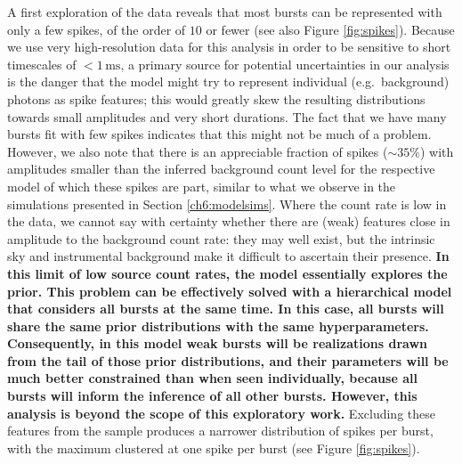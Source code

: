 \documentclass[12pt]{emulateapj}
\newcommand{\project}[1]{\textsl{#1}}
\newcommand{\fermi}{\project{Fermi}}
\begin{document}
A first exploration of the data reveals that most bursts can be represented with only a few spikes, of the order of 
$10$ or fewer (see also Figure \ref{fig:spikes}). Because we use very high-resolution data for this analysis in order to
be sensitive to short timescales of $< 1\,\mathrm{ms}$, a primary source for potential uncertainties in our analysis is the
danger that the model might try to represent individual (e.g.\ background) photons as spike features; this would greatly
skew the resulting distributions towards small amplitudes and very short durations. The fact that we have many bursts
fit with few spikes indicates that this might not be much of a problem. However, we also note that there is an appreciable fraction
of spikes ($\sim 35\%$) with amplitudes smaller than the inferred background count level for the respective model of which these spikes 
are part, similar to what we observe in the simulations presented in Section \ref{ch6:modelsims}. Where the count rate is low in the
data, we cannot say with certainty whether there are (weak) features close in amplitude to the background count rate: they may well exist, but the intrinsic sky and instrumental background
 make it difficult to ascertain their presence. {\bf In this limit of low source count rates, the model essentially explores the prior. 
 This problem can be effectively solved with a hierarchical model that considers all bursts at the same time. In this case, all bursts will share the same prior
 distributions with the same hyperparameters. Consequently, in this model weak bursts will be realizations drawn from the tail of those prior distributions, and their parameters will be much better constrained than when seen individually, because all bursts will inform the inference of all other bursts. However, this analysis is beyond the scope of this exploratory work.} Excluding these features from the sample produces a narrower distribution
of spikes per burst, with the maximum clustered at one spike per burst (see Figure \ref{fig:spikes}).

\end{document}
